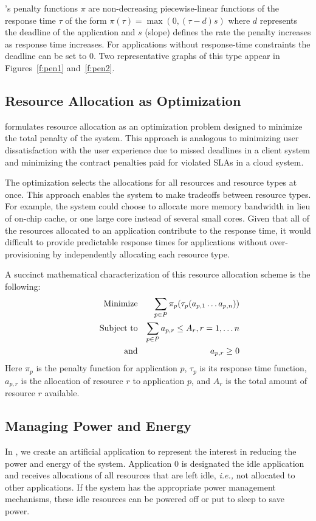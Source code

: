 \pacora's penalty functions $\pi$ are non-decreasing piecewise-linear
functions of the response time $\tau$ of the form $\pi(\tau) = \max(0, (\tau - d)s)$
where $d$ represents the deadline of the application and $s$ (slope)
defines the rate the penalty increases as response time increases. For
applications without response-time constraints the deadline can be set
to $0$. Two representative graphs of this type appear in
Figures~\ref{f:pen1} and~\ref{f:pen2}.

\subsection{Resource Allocation as Optimization}

\pacora formulates resource allocation as an optimization problem
designed to minimize the total penalty of the system. This approach is
analogous to minimizing user dissatisfaction with the user experience
due to missed deadlines in a client system and minimizing the contract
penalties paid for violated SLAs in a cloud
system.

The optimization selects the allocations for all resources and
resource types at once.  This approach enables the system to make
tradeoffs between resource types.  For example, the system could
choose to allocate more memory bandwidth in lieu of on-chip cache, or
one large core instead of several small cores.  Given that all of the
resources allocated to an application contribute to the response time,
it would difficult to provide predictable response times for
applications without over-provisioning by independently allocating each resource type.

A succinct mathematical characterization of this resource allocation scheme is the following:
\begin{eqnarray}
& \makebox[1in][r]{Minimize}   & \sum_{p\in P} {\pi_p(\tau_p(a_{p,1}\ldots a_{p,n}))}  \\
& \makebox[1in][r]{Subject to} & \sum_{p\in P} a_{p,r} \leq A_r, r = 1,\ldots n        \\
& \makebox[1in][r]{and}        & a_{p,r} \geq 0
\end{eqnarray}
Here $\pi_p$ is the penalty function for application $p$,
$\tau_p$ is its response time function,
$a_{p,r}$ is the allocation of resource $r$ to application $p$,
and $A_r$ is the total amount of resource $r$ available. 

\subsection{Managing Power and Energy}
In \pacora, we create an artificial application to represent the
interest in reducing the power and energy of the system.  Application 0 is
designated the idle application and receives allocations of all
resources that are left idle, \emph{i.e.,} not allocated to other
applications.  If the system has the appropriate power management mechanisms, these idle resources can be powered off or put to sleep to save power.

